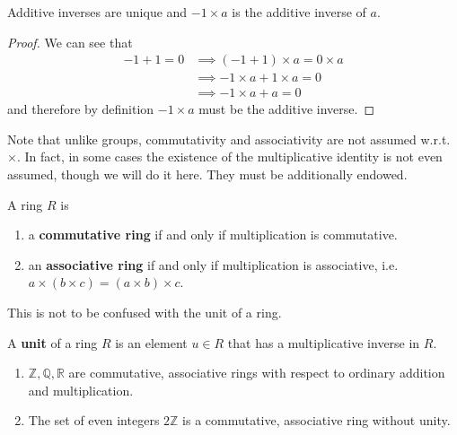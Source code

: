    \begin{lemma} 
      Additive inverses are unique and $-1 \times a$ is the additive inverse of $a$. 
    \end{lemma}
    \begin{proof}
      We can see that 
      \begin{align}
        -1 + 1 = 0 & \implies (-1 + 1) \times a = 0 \times a \\
                   & \implies -1 \times a + 1 \times a = 0 \\
                   & \implies -1 \times a + a = 0 
      \end{align}
      and therefore by definition $-1 \times a$ must be the additive inverse. 
    \end{proof}

    Note that unlike groups, commutativity and associativity are not assumed w.r.t. $\times$. In fact, in some cases the existence of the multiplicative identity is not even assumed, though we will do it here. They must be additionally endowed. 

    \begin{definition}
      A ring $R$ is 
      \begin{enumerate}
        \item a \textbf{commutative ring} if and only if multiplication is commutative. 
        \item an \textbf{associative ring} if and only if multiplication is associative, i.e. $a \times (b \times c) = (a \times b) \times c$. 
      \end{enumerate}
    \end{definition}

    This is not to be confused with the unit of a ring. 

    \begin{definition}[Unit]
      A \textbf{unit} of a ring $R$ is an element $u \in R$ that has a multiplicative inverse in $R$. 
    \end{definition}

    \begin{example} 
      \begin{enumerate}
        \item $\mathbb{Z}, \mathbb{Q}, \mathbb{R}$ are commutative, associative rings with respect to ordinary addition and multiplication.
        \item The set of even integers $2\mathbb{Z}$ is a commutative, associative ring without unity.
      \end{enumerate}
    \end{example}

